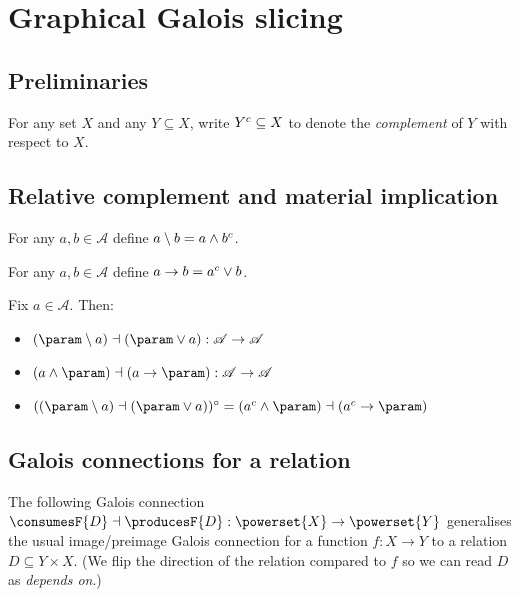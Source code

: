 \section{Graphical Galois slicing}
\label{sec:graph}

\subsection{Preliminaries}

\begin{definition}[Complement]
   For any set $X$ and any $Y \subseteq X$, write $Y^{c} \subseteq X$ to denote the \textit{complement} of $Y$
   with respect to $X$.
\end{definition}

\subsection{Relative complement and material implication}

\begin{definition}
   For any $a, b  \in \mathcal{A}$ define $a \setminus b = a \wedge b^{c}$.
\end{definition}

\begin{definition}
   For any $a, b  \in \mathcal{A}$ define $a \to b = a^{c} \vee b$.
\end{definition}

\begin{lemma}
   Fix $a \in \mathcal{A}$. Then:
   \begin{itemize}
      \item $(\param \diff a) \adjoint (\param \join a): \mathcal{A} \to \mathcal{A}$
      \item $(a \meet \param) \adjoint (a \impl \param): \mathcal{A} \to \mathcal{A}$
      \item $\dual{((\param \diff a) \adjoint (\param \join a))} = (\compl a \meet \param) \adjoint (\compl a \impl \param)$
   \end{itemize}
\end{lemma}

\subsection{Galois connections for a relation}

The following Galois connection $\consumesF{D} \adjoint \producesF{D}: \powerset{X} \to \powerset{Y}$
generalises the usual image/preimage Galois connection for a function $f: X \to Y$ to a relation $D \subseteq
Y \times X$. (We flip the direction of the relation compared to $f$ so we can read $D$ as \emph{depends on}.)

